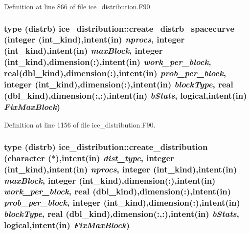 Definition at line 866 of file ice\_\-distribution.F90.\hypertarget{namespaceice__distribution_af881e23fc62ccdac1da09fed38e55236}{
\subsubsection[{create\_\-distrb\_\-spacecurve}]{\setlength{\rightskip}{0pt plus 5cm}type ({\bf distrb}) ice\_\-distribution::create\_\-distrb\_\-spacecurve (integer (int\_\-kind),intent(in) {\em nprocs}, \/  integer (int\_\-kind),intent(in) {\em maxBlock}, \/  integer (int\_\-kind),dimension(:),intent(in) {\em work\_\-per\_\-block}, \/  real(dbl\_\-kind),dimension(:),intent(in) {\em prob\_\-per\_\-block}, \/  integer (int\_\-kind),dimension(:),intent(in) {\em blockType}, \/  real (dbl\_\-kind),dimension(:,:),intent(in) {\em bStats}, \/  logical,intent(in) {\em FixMaxBlock})}}
\label{namespaceice__distribution_af881e23fc62ccdac1da09fed38e55236}


Definition at line 1156 of file ice\_\-distribution.F90.\hypertarget{namespaceice__distribution_aa44f38ec08146a52959957cbad5b093d}{
\subsubsection[{create\_\-distribution}]{\setlength{\rightskip}{0pt plus 5cm}type ({\bf distrb}) ice\_\-distribution::create\_\-distribution (character ($\ast$),intent(in) {\em dist\_\-type}, \/  integer (int\_\-kind),intent(in) {\em nprocs}, \/  integer (int\_\-kind),intent(in) {\em maxBlock}, \/  integer (int\_\-kind),dimension(:),intent(in) {\em work\_\-per\_\-block}, \/  real (dbl\_\-kind),dimension(:),intent(in) {\em prob\_\-per\_\-block}, \/  integer (int\_\-kind),dimension(:),intent(in) {\em blockType}, \/  real (dbl\_\-kind),dimension(:,:),intent(in) {\em bStats}, \/  logical,intent(in) {\em FixMaxBlock})}}
\label{namespaceice__distribution_aa44f38ec08146a52959957cbad5b093d}


